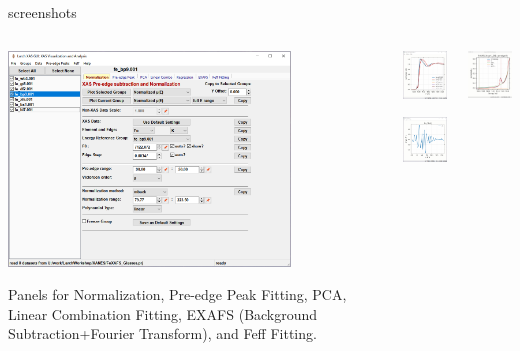 \begin{slide}{ {\xasviewer} screenshots}

  \begin{cenpage}{145mm}

    \begin{columns}
    \begin{column}{75mm}
      \includegraphics[width=75mm]{figs/Screenshots/XASViewer_Main}

      Panels for Normalization, Pre-edge Peak Fitting, PCA, Linear
      Combination Fitting, EXAFS (Background Subtraction+Fourier
      Transform), and Feff Fitting.
      
      \vfill
    \end{column}
    \begin{column}{30mm}
      \includegraphics[width=30mm]{figs/Screenshots/XASViewer_MainPlot}
      
      \vmm
      \includegraphics[width=30mm]{figs/Screenshots/XASViewer_EXAFS_plot1}

      \vmm \vfill
    \end{column}

      \begin{column}{30mm}
        \includegraphics[width=30mm]{figs/Screenshots/XASViewer_plot_peakfit}


\end{column}
\end{columns}
\end{cenpage}
\end{slide}
